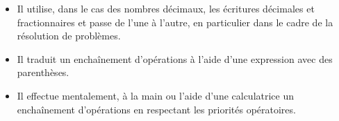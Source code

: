 \begin{prerequis}[Objectifs de 5\up{e}]    
    \begin{itemize}
        \item Il utilise, dans le cas des nombres décimaux, les écritures décimales et fractionnaires et passe de l’une à l’autre, en particulier dans le cadre de la résolution de problèmes.
        \columnbreak
        \item Il traduit un enchaînement d’opérations à l’aide d’une expression avec des parenthèses.
        \item Il effectue mentalement, à la main ou l’aide d’une calculatrice un enchaînement d’opérations en respectant les priorités opératoires. 
    \end{itemize}
\end{prerequis}
